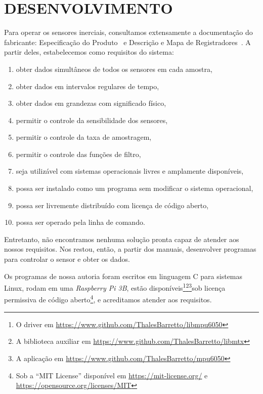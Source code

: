\chapter{DESENVOLVIMENTO}\label{chap:desenvolvimento}

Para operar os sensores inerciais, consultamos extensamente a documentação do fabricante: Especificação do Produto~\cite{mpu6050ps} e Descrição e Mapa de Registradores~\cite{mpu6050rm}.
A partir deles, estabelecemos como requisitos do sistema:
\begin{enumerate}
        \item obter dados simultâneos de todos os sensores em cada amostra,
        \item obter dados em intervalos regulares de tempo,
        \item obter dados em grandezas com significado físico,
        \item permitir o controle da sensibilidade dos sensores,
        \item permitir o controle da taxa de amostragem,
        \item permitir o controle das funções de filtro,
        \item seja utilizável com sistemas operacionais livres e amplamente disponíveis,
        \item possa ser instalado como um programa sem modificar o sistema operacional,
        \item possa ser livremente distribuído com licença de código aberto,
        \item possa ser operado pela linha de comando.
\end{enumerate}

Entretanto, não encontramos nenhuma solução pronta capaz de atender aos nossos requisitos. Nos restou, então, a partir dos manuais, desenvolver programas para controlar o sensor e obter os dados.

Os programas de nossa autoria foram escritos em linguagem C para sistemas Linux, rodam em uma \emph{Raspberry Pi 3B}, estão disponíveis\footnote{O driver em \href{https://www.github.com/ThalesBarretto/libmpu6050}{https://www.github.com/ThalesBarretto/libmpu6050}}\footnote{A biblioteca auxiliar em \href{https://www.github.com/ThalesBarretto/libmtx}{https://www.github.com/ThalesBarretto/libmtx}}\footnote{A aplicação em \href{https://www.github.com/ThalesBarretto/mpu6050}{https://www.github.com/ThalesBarretto/mpu6050}}sob licença permissiva de código aberto\footnote{Sob a ``MIT License'' disponível em \href{https://mit-license.org/}{https://mit-license.org/} e \href{https://opensource.org/licenses/MIT}{https://opensource.org/licenses/MIT}}, e acreditamos atender aos requisitos.

